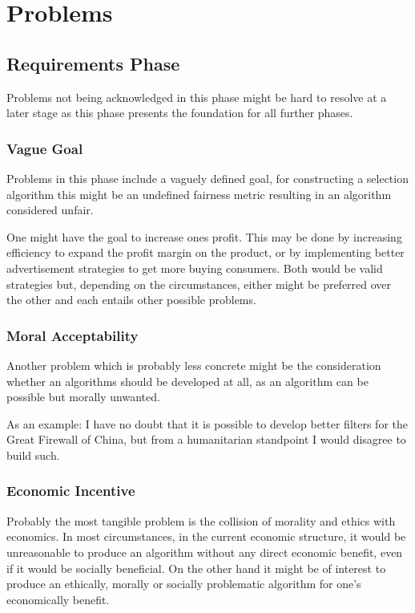 \section{Problems}

\subsection{Requirements Phase}
Problems not being acknowledged in this phase might be hard to resolve at a later stage as this phase presents the foundation for all further phases. 

\subsubsection{Vague Goal}
Problems in this phase include a vaguely defined goal,
for constructing a selection algorithm this might be 
an undefined fairness metric resulting in an algorithm considered unfair.

One might have the goal to increase ones profit. This may be done by increasing efficiency to expand the profit margin on the product, or by implementing better
advertisement strategies to get more buying consumers. Both would be valid strategies but, depending on the circumstances, either might be preferred over the other and each entails other possible problems.

\subsubsection{Moral Acceptability}

Another problem which is probably less concrete might be the consideration whether an algorithms should be developed at all,
as an algorithm can be possible but morally unwanted.

As an example:
I have no doubt that it is possible to develop better filters for the Great Firewall of China, but from a humanitarian standpoint I would disagree to build such.

\subsubsection{Economic Incentive}

Probably the most tangible problem is the collision of morality and ethics with economics. 
In most circumstances, in  the current economic structure, it would be unreasonable to produce an algorithm without any direct economic benefit, even if it would be socially beneficial. 
On the other hand it might be of interest to produce an ethically, morally or socially problematic algorithm for one's economically benefit. 

